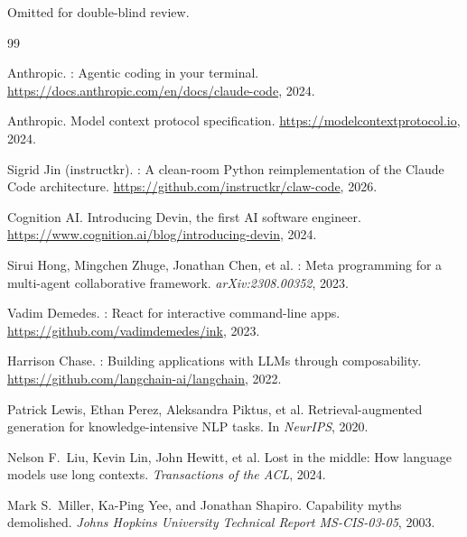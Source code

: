 \documentclass{article}
\begin{document}
\begin{ack}
Omitted for double-blind review.
\end{ack}

\begin{thebibliography}{99}

Anthropic.
: Agentic coding in your terminal.
\newblock \url{https://docs.anthropic.com/en/docs/claude-code}, 2024.

Anthropic.
\newblock Model context protocol specification.
\newblock \url{https://modelcontextprotocol.io}, 2024.

Sigrid Jin (instructkr).
: A clean-room Python reimplementation of the Claude Code architecture.
\newblock \url{https://github.com/instructkr/claw-code}, 2026.

Cognition AI.
\newblock Introducing {Devin}, the first {AI} software engineer.
\newblock \url{https://www.cognition.ai/blog/introducing-devin}, 2024.

Sirui Hong, Mingchen Zhuge, Jonathan Chen, et al.
: Meta programming for a multi-agent collaborative framework.
\newblock \textit{arXiv:2308.00352}, 2023.

Vadim Demedes.
: React for interactive command-line apps.
\newblock \url{https://github.com/vadimdemedes/ink}, 2023.

Harrison Chase.
: Building applications with {LLMs} through composability.
\newblock \url{https://github.com/langchain-ai/langchain}, 2022.

Patrick Lewis, Ethan Perez, Aleksandra Piktus, et al.
\newblock Retrieval-augmented generation for knowledge-intensive {NLP} tasks.
\newblock In \textit{NeurIPS}, 2020.

Nelson F.\ Liu, Kevin Lin, John Hewitt, et al.
\newblock Lost in the middle: How language models use long contexts.
\newblock \textit{Transactions of the ACL}, 2024.

Mark S.\ Miller, Ka-Ping Yee, and Jonathan Shapiro.
\newblock Capability myths demolished.
\newblock \textit{Johns Hopkins University Technical Report MS-CIS-03-05}, 2003.


\end{thebibliography}
\end{document}
